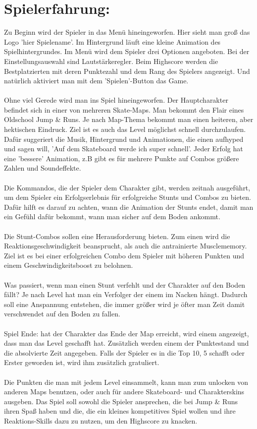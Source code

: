 \documentclass[paper=a4,fontsize=12pt,ngerman]{scrartcl}
\begin{document}
\section{Spielerfahrung:}
Zu Beginn wird der Spieler in das Menü hineingeworfen. Hier sieht man groß das Logo 'hier
Spielename'. Im Hintergrund läuft eine kleine Animation des Spielhintergrundes. Im Menü
wird dem Spieler drei Optionen angeboten. Bei der Einstellungsauswahl sind
Lautstärkeregler. Beim Highscore werden die Bestplatzierten mit deren Punktezahl und
dem Rang des Spielers angezeigt. Und natürlich aktiviert man mit dem 'Spielen'-Button das
Game.\\ \\
Ohne viel Gerede wird man ins Spiel hineingeworfen. Der Hauptcharakter befindet sich in
einer von mehreren Skate-Maps. Man bekommt den Flair eines Oldschool Jump \& Runs.
Je nach Map-Thema bekommt man einen heiteren, aber hektischen Eindruck. Ziel ist es auch
das Level möglichst schnell durchzulaufen. Dafür suggeriert die Musik, Hintergrund und
Animationen, die einen aufhyped und sagen will, 'Auf dem Skateboard werde ich super
schnell'. Jeder Erfolg hat eine 'bessere' Animation, z.B gibt es für mehrere Punkte auf
Combos größere Zahlen und Soundeffekte.\\ \\
Die Kommandos, die der Spieler dem Charakter gibt, werden zeitnah ausgeführt,
um dem Spieler ein Erfolgserlebnis für erfolgreiche Stunts und Combos zu bieten. Dafür hilft
es darauf zu achten, wann die Animation der Stunts endet, damit man ein Gefühl dafür
bekommt, wann man sicher auf dem Boden ankommt.\\ \\
Die Stunt-Combos sollen eine Herausforderung bieten. Zum einen wird die
Reaktionsgeschwindigkeit beansprucht, als auch die antrainierte Musclememory. Ziel ist es
bei einer erfolgreichen Combo dem Spieler mit höheren Punkten und einem
Geschwindigkeitsboost zu belohnen.\\ \\
Was passiert, wenn man einen Stunt verfehlt und der Charakter auf den Boden fällt? Je
nach Level hat man ein Verfolger der einem im Nacken hängt. Dadurch soll eine
Anspannung entstehen, die immer größer wird je öfter man Zeit damit verschwendet auf den
Boden zu fallen.\\ \\
Spiel Ende: hat der Charakter das Ende der Map erreicht, wird einem angezeigt,
dass man das Level geschafft hat. Zusätzlich werden einem der Punktestand und die
absolvierte Zeit angegeben. Falls der Spieler es in die Top 10, 5 schafft oder Erster geworden ist,
wird ihm zusätzlich gratuliert.\\ \\
Die Punkten die man mit jedem Level einsammelt, kann man zum unlocken von anderen
Maps benutzen, oder auch für andere Skateboard- und Charakterskins ausgeben.
Das Spiel soll sowohl die Spieler ansprechen, die bei Jump \& Runs ihren Spaß haben und
die, die ein kleines kompetitives Spiel wollen und ihre Reaktions-Skills dazu zu nutzen, um
den Highscore zu knacken.
\clearpage
\end{document}
